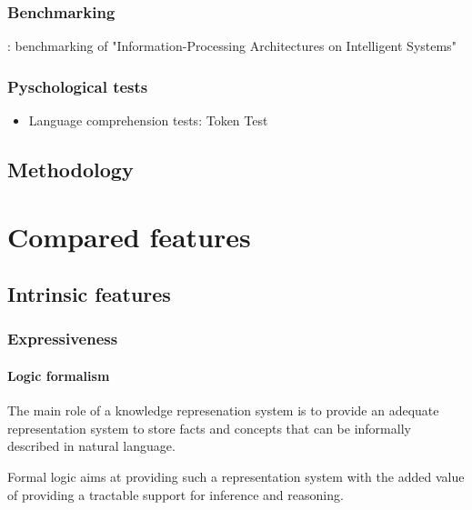 \documentclass[a4paper, twocolumn]{article}
\begin{document}
\subsubsection{Benchmarking}
\label{sect|benchmarking}

\cite{Hawes2008}: benchmarking of "Information-Processing Architectures on Intelligent Systems"
\subsubsection{Pyschological tests}
\label{sect|evaluation-tests}

\begin{itemize}
	\item Language comprehension tests: Token Test~\cite{DiSimoni1978}
\end{itemize}

\subsection{Methodology}
\label{sect|methodology}



\section{Compared features}
\label{sect|compared-features}

\subsection{Intrinsic features}
\label{sect|intrinsic-features}

\subsubsection{Expressiveness}
\label{sect|expressiveness}

\paragraph{Logic formalism}

The main role of a knowledge represenation system is to provide an adequate
representation system to store facts and concepts that can be informally
described in natural language.

Formal logic aims at providing such a representation system with the added
value of providing a tractable support for inference and reasoning.
\end{document}
